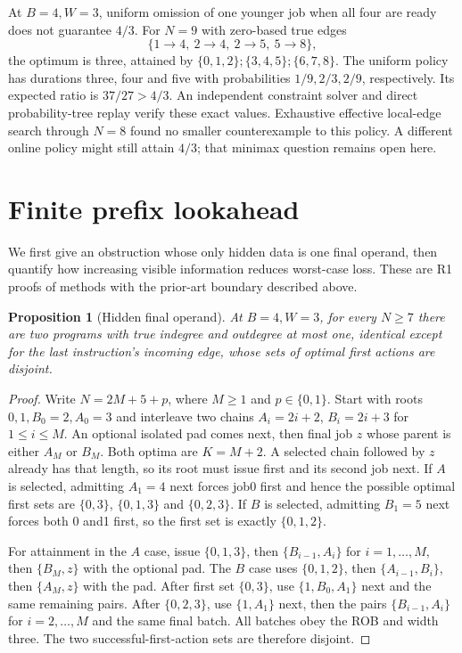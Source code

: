 \documentclass[11pt]{article}
\newtheorem{proposition}[theorem]{Proposition}
\begin{document}
At $B=4,W=3$, uniform omission of one younger job when all four are ready
does not guarantee $4/3$. For $N=9$ with zero-based true edges
\[
 \{1\to4,\ 2\to4,\ 2\to5,\ 5\to8\},
\]
the optimum is three, attained by
$\{0,1,2\};\{3,4,5\};\{6,7,8\}$. The uniform policy has durations
three, four and five with probabilities $1/9,2/3,2/9$, respectively.
Its expected ratio is $37/27>4/3$. An independent constraint solver and
direct probability-tree replay verify these exact values. Exhaustive
effective local-edge search through $N=8$ found no smaller counterexample
to this policy. A different online policy might still attain $4/3$;
that minimax question remains open here.

\section{Finite prefix lookahead}
We first give an obstruction whose only hidden data is one final operand,
then quantify how increasing visible information reduces worst-case loss.
These are R1 proofs of methods with the prior-art boundary described above.

\begin{proposition}[Hidden final operand]
At $B=4,W=3$, for every $N\ge7$ there are two programs with true indegree
and outdegree at most one, identical except for the last instruction's
incoming edge, whose sets of optimal first actions are disjoint.
\end{proposition}
\begin{proof}
Write $N=2M+5+p$, where $M\ge1$ and $p\in\{0,1\}$. Start with roots
$0,1,B_0=2,A_0=3$ and interleave two chains
$A_i=2i+2$, $B_i=2i+3$ for $1\le i\le M$. An optional isolated pad
comes next, then final job $z$ whose parent is either $A_M$ or $B_M$.
Both optima are $K=M+2$. A selected chain followed by $z$ already has
that length, so its root must issue first and its second job next.
If $A$ is selected, admitting $A_1=4$ next forces job0 first and hence
the possible optimal first sets are $\{0,3\}$, $\{0,1,3\}$ and
$\{0,2,3\}$. If $B$ is selected, admitting $B_1=5$ next forces both
0 and1 first, so the first set is exactly $\{0,1,2\}$.

For attainment in the $A$ case, issue $\{0,1,3\}$, then
$\{B_{i-1},A_i\}$ for $i=1,\ldots,M$, then $\{B_M,z\}$ with the
optional pad. The $B$ case uses $\{0,1,2\}$, then
$\{A_{i-1},B_i\}$, then $\{A_M,z\}$ with the pad.
After first set $\{0,3\}$, use $\{1,B_0,A_1\}$ next and the same
remaining pairs. After $\{0,2,3\}$, use $\{1,A_1\}$ next, then the
pairs $\{B_{i-1},A_i\}$ for $i=2,\ldots,M$ and the same final batch.
All batches obey the ROB and width three.
The two successful-first-action sets are therefore disjoint.
\end{proof}
\end{document}
